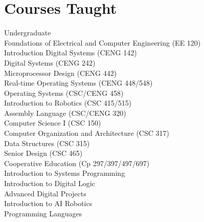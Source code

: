 \documentclass[12pt,letter]{resume}
\begin{document}
\section{Courses Taught}{Undergraduate}
        {\\
          \hspace*{1em} Foundations of Electrical and Computer Engineering (EE 120)\\
          \hspace*{1em} Introduction Digital Systems (CENG 142)\\
          \hspace*{1em} Digital Systems (CENG 242)\\          
          \hspace*{1em} Microprocessor Design (CENG 442)\\
          \hspace*{1em} Real-time Operating Systems (CENG 448/548)\\
          \hspace*{1em} Operating Systems (CSC/CENG 458)\\
          \hspace*{1em} Introduction to Robotics (CSC 415/515)\\
          \hspace*{1em} Assembly Language (CSC/CENG 320)\\
          \hspace*{1em} Computer Science I (CSC 150)\\
          \hspace*{1em} Computer Organization and Architecture (CSC 317)\\
          \hspace*{1em} Data Structures (CSC 315)\\
          \hspace*{1em} Senior Design (CSC 465)\\
          \hspace*{1em} Cooperative Education (Cp 297/397/497/697)\\
\hspace*{1em} Introduction to Systems Programming\\
\hspace*{1em} Introduction to Digital Logic\\
\hspace*{1em} Advanced Digital Projects\\
\hspace*{1em} Introduction to AI Robotics\\
\hspace*{1em} Programming Languages
}
\end{document}
